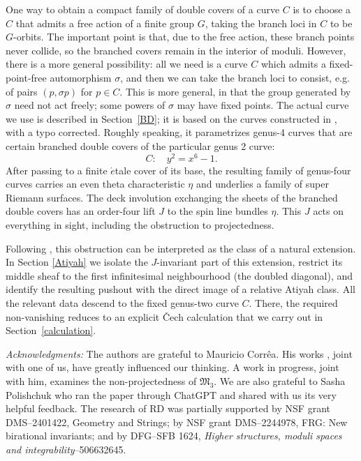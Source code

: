 \documentclass[11pt,a4paper,dvipsnames]{amsart}
\numberwithin{equation}{section}
\theoremstyle{plain}
\theoremstyle{definition}
\newcommand{\M}{\mathfrak M}
\begin{document}
One way to obtain a compact family of double covers of a curve $C$ is to choose a $C$ that admits a free action of a finite group $G$, taking the branch loci in $C$ to be $G$-orbits. The important point is that, due to the free action, these branch points never collide, so the branched covers remain in the interior of moduli.
However, there is a more general possibility: all we need is a curve $C$ which admits a fixed-point-free automorphism $\sigma$, and then we can take the branch loci to consist, e.g. of pairs $(p,\sigma p)$ for $p \in C$. This is more general, in that the group generated by $\sigma$ need not act freely; some powers of $\sigma$ may have fixed points.
The actual curve we use is described in Section~\ref{BD}; it is based on the curves constructed in
 \cite[\S2.1]{BryanDonagi}, with a typo corrected.  
Roughly speaking, it parametrizes genus-4 curves that are certain branched double covers of the particular genus 2 curve:
$$
 C:\quad y^2=x^6-1.
$$
After passing to a finite
$\acute{e}$tale
cover of its base, the resulting family of genus-four curves  carries an even theta
characteristic $\eta$ and underlies a family of super  Riemann surfaces.
The deck involution exchanging the sheets of the branched double covers has an order-four lift $J$ to the spin
line bundles $\eta$.  This $J$ acts on everything in sight, including the obstruction to projectedness.

Following \cite[\S3.2 and Proposition~3.1]{DonagiWittenAtiyah}, this obstruction can be interpreted as the class of a natural extension.
In Section \ref{Atiyah} we isolate the $J$-invariant part of this
extension, restrict its middle sheaf to the first infinitesimal
neighbourhood (the doubled diagonal), and identify the resulting pushout with
the direct image of a relative Atiyah class.
All the relevant data descend to the fixed
genus-two curve $C$.
There, the required non-vanishing reduces to an explicit \v Cech
calculation that we carry out in Section~\ref{calculation}.

\emph{Acknowledgments:} The authors are grateful to Mauricio Corr\^ea. His works 
\cite{CorreaNojaSplitting, CorreaNojaCompactified},
joint with one of us, have greatly influenced our thinking.
A work in progress, joint with him, examines the non-projectedness of $\M_3$.
We are also grateful to Sasha Polishchuk who ran the paper through
ChatGPT and shared with us its very helpful feedback.
The research of RD was partially supported 
by NSF grant DMS–2401422, Geometry and Strings; 
by NSF grant DMS–2244978, FRG: New birational invariants;
and by DFG--SFB 1624, \emph{Higher structures, moduli spaces and integrability}--506632645.
\end{document}
